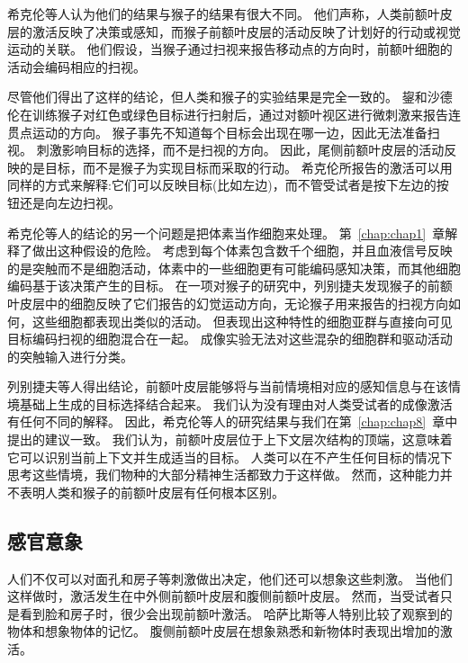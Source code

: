 希克伦等人\cite{heekeren2006involvement}认为他们的结果与猴子的结果有很大不同。
他们声称，人类前额叶皮层的激活反映了决策或感知，而猴子前额叶皮层的活动反映了计划好的行动或视觉运动的关联。
他们假设，当猴子通过扫视来报告移动点的方向时，前额叶细胞的活动会编码相应的扫视\cite{kim1999neural}。
\par


尽管他们得出了这样的结论，但人类和猴子的实验结果是完全一致的。
鋆和沙德伦\cite{gold2007neural}在训练猴子对红色或绿色目标进行扫射后，通过对额叶视区进行微刺激来报告连贯点运动的方向。
猴子事先不知道每个目标会出现在哪一边，因此无法准备扫视。
刺激影响目标的选择，而不是扫视的方向。
因此，尾侧前额叶皮层的活动反映的是目标，而不是猴子为实现目标而采取的行动。
希克伦所报告的激活可以用同样的方式来解释:它们可以反映目标(比如左边)，而不管受试者是按下左边的按钮还是向左边扫视。
\par


希克伦等人的结论的另一个问题是把体素当作细胞来处理。
第~\ref{chap:chap1}~章解释了做出这种假设的危险。
考虑到每个体素包含数千个细胞，并且血液信号反映的是突触而不是细胞活动，体素中的一些细胞更有可能编码感知决策，而其他细胞编码基于该决策产生的目标。
在一项对猴子的研究中，列别捷夫\cite{lebedev2001prefrontal}发现猴子的前额叶皮层中的细胞反映了它们报告的幻觉运动方向，无论猴子用来报告的扫视方向如何，这些细胞都表现出类似的活动。
但表现出这种特性的细胞亚群与直接向可见目标编码扫视的细胞混合在一起。
成像实验无法对这些混杂的细胞群和驱动活动的突触输入进行分类。
\par


列别捷夫等人得出结论，前额叶皮层能够将与当前情境相对应的感知信息与在该情境基础上生成的目标选择结合起来。
我们认为没有理由对人类受试者的成像激活有任何不同的解释。
因此，希克伦等人的研究结果与我们在第~\ref{chap:chap8}~章中提出的建议一致。
我们认为，前额叶皮层位于上下文层次结构的顶端，这意味着它可以识别当前上下文并生成适当的目标。
人类可以在不产生任何目标的情况下思考这些情境，我们物种的大部分精神生活都致力于这样做。
然而，这种能力并不表明人类和猴子的前额叶皮层有任何根本区别。



\subsection{感官意象}
\par

人们不仅可以对面孔和房子等刺激做出决定，他们还可以想象这些刺激。
当他们这样做时，激活发生在中外侧前额叶皮层\cite{ishai2000distributed}和腹侧前额叶皮层\cite{ishai2002visual}。
然而，当受试者只是看到脸和房子时，很少会出现前额叶激活。
哈萨比斯等人\cite{hassabis2007using}特别比较了观察到的物体和想象物体的记忆。
腹侧前额叶皮层在想象熟悉和新物体时表现出增加的激活。
\par


